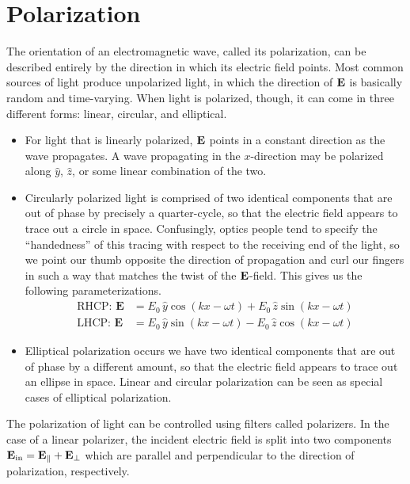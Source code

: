 \documentclass[../p051main.tex]{subfiles}
\begin{document}
\section{Polarization}
The orientation of an electromagnetic wave, called its polarization, can be described entirely by the direction in which its electric field points.
Most common sources of light produce unpolarized light, in which the direction of $\mathbf{E}$ is basically random and time-varying.
When light is polarized, though, it can come in three different forms: linear, circular, and elliptical.
\begin{itemize}
    \item For light that is linearly polarized, $\mathbf{E}$ points in a constant direction as the wave propagates.
    A wave propagating in the $x$-direction may be polarized along $\hat y$, $\hat z$, or some linear combination of the two.

    \item Circularly polarized light is comprised of two identical components that are out of phase by precisely a quarter-cycle, so that the electric field appears to trace out a circle in space.
    Confusingly, optics people tend to specify the ``handedness'' of this tracing with respect to the receiving end of the light, so we point our thumb opposite the direction of propagation and curl our fingers in such a way that matches the twist of the $\mathbf{E}$-field.
    This gives us the following parameterizations.
    \begin{align*}
        \textrm{RHCP: } \mathbf{E} &= E_0 \,\hat{y} \cos(kx - \omega t) + E_0 \,\hat{z} \sin(kx - \omega t) \\
        \textrm{LHCP: } \mathbf{E} &= E_0 \,\hat{y} \sin(kx - \omega t) - E_0 \,\hat{z} \cos(kx - \omega t)
    \end{align*}
    \vspace{-18pt}

    \item Elliptical polarization occurs we have two identical components that are out of phase by a different amount, so that the electric field appears to trace out an ellipse in space.
    Linear and circular polarization can be seen as special cases of elliptical polarization.
\end{itemize}
The polarization of light can be controlled using filters called polarizers.
In the case of a linear polarizer, the incident electric field is split into two components $\mathbf{E}_\textrm{in} = \mathbf{E}_\parallel + \mathbf{E}_\perp$ which are parallel and perpendicular to the direction of polarization, respectively.
\end{document}
